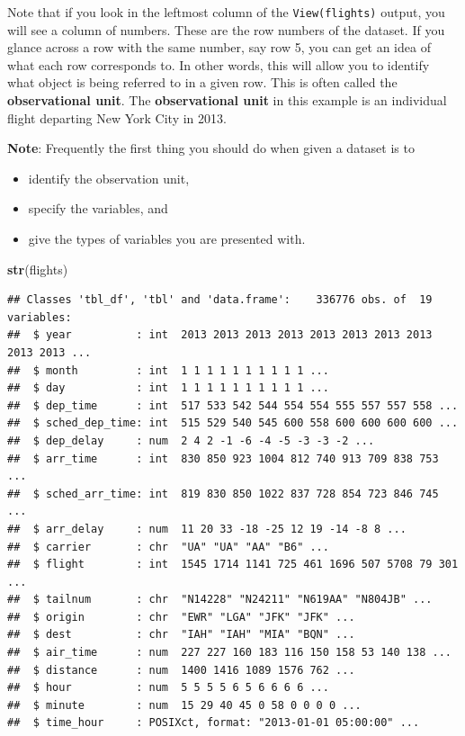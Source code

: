 \documentclass[]{tufte-book}
\newenvironment{Shaded}{\begin{snugshade}}{\end{snugshade}}
\newcommand{\KeywordTok}[1]{\textcolor[rgb]{0.13,0.29,0.53}{\textbf{{#1}}}}
\newcommand{\NormalTok}[1]{{#1}}
\providecommand{\tightlist}{%
  \setlength{\itemsep}{0pt}\setlength{\parskip}{0pt}}
\begin{document}
Note that if you look in the leftmost column of the
\texttt{View(flights)} output, you will see a column of numbers. These
are the row numbers of the dataset. If you glance across a row with the
same number, say row 5, you can get an idea of what each row corresponds
to. In other words, this will allow you to identify what object is being
referred to in a given row. This is often called the
\textbf{observational unit}. The \textbf{observational unit} in this
example is an individual flight departing New York City in 2013.

\textbf{Note}: Frequently the first thing you should do when given a
dataset is to

\begin{itemize}
\tightlist
\item
  identify the observation unit,
\item
  specify the variables, and
\item
  give the types of variables you are presented with.
\end{itemize}

\begin{Shaded}
\begin{Highlighting}[]
\KeywordTok{str}\NormalTok{(flights)}
\end{Highlighting}
\end{Shaded}

\begin{verbatim}
## Classes 'tbl_df', 'tbl' and 'data.frame':    336776 obs. of  19 variables:
##  $ year          : int  2013 2013 2013 2013 2013 2013 2013 2013 2013 2013 ...
##  $ month         : int  1 1 1 1 1 1 1 1 1 1 ...
##  $ day           : int  1 1 1 1 1 1 1 1 1 1 ...
##  $ dep_time      : int  517 533 542 544 554 554 555 557 557 558 ...
##  $ sched_dep_time: int  515 529 540 545 600 558 600 600 600 600 ...
##  $ dep_delay     : num  2 4 2 -1 -6 -4 -5 -3 -3 -2 ...
##  $ arr_time      : int  830 850 923 1004 812 740 913 709 838 753 ...
##  $ sched_arr_time: int  819 830 850 1022 837 728 854 723 846 745 ...
##  $ arr_delay     : num  11 20 33 -18 -25 12 19 -14 -8 8 ...
##  $ carrier       : chr  "UA" "UA" "AA" "B6" ...
##  $ flight        : int  1545 1714 1141 725 461 1696 507 5708 79 301 ...
##  $ tailnum       : chr  "N14228" "N24211" "N619AA" "N804JB" ...
##  $ origin        : chr  "EWR" "LGA" "JFK" "JFK" ...
##  $ dest          : chr  "IAH" "IAH" "MIA" "BQN" ...
##  $ air_time      : num  227 227 160 183 116 150 158 53 140 138 ...
##  $ distance      : num  1400 1416 1089 1576 762 ...
##  $ hour          : num  5 5 5 5 6 5 6 6 6 6 ...
##  $ minute        : num  15 29 40 45 0 58 0 0 0 0 ...
##  $ time_hour     : POSIXct, format: "2013-01-01 05:00:00" ...
\end{verbatim}
\end{document}
